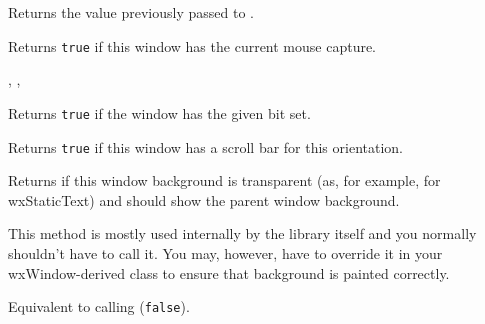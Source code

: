 
Returns the value previously passed to
.


\label{wxwindowhascapture}


Returns {\tt true} if this window has the current mouse capture.


,
,


\label{wxwindowhasflag}


Returns \texttt{true} if the window has the given  bit set.


\label{wxwindowhasscrollbar}


Returns {\tt true} if this window has a scroll bar for this orientation.




\label{wxwindowhastransparentbackground}


Returns \true if this window background is transparent (as, for example, for
wxStaticText) and should show the parent window background.

This method is mostly used internally by the library itself and you normally
shouldn't have to call it. You may, however, have to override it in your
wxWindow-derived class to ensure that background is painted correctly.


\label{wxwindowhide}


Equivalent to calling ({\tt false}).


\label{wxwindowinheritattributes}

